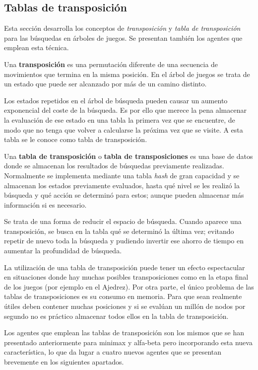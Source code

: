 \subsection{Tablas de transposición}
\label{ssec:tablas_transposicion}
Esta sección desarrolla los conceptos de \textit{transposición} y \textit{tabla de transposición} para las búsquedas en árboles de juegos.
Se presentan también los agentes que emplean esta técnica.

\bigskip
Una \textbf{transposición} es una permutación diferente de una secuencia de movimientos que termina en la misma posición.
En el árbol de juegos se trata de un estado que puede ser alcanzado por más de un camino distinto.

Los estados repetidos en el árbol de búsqueda pueden causar un aumento exponencial del coste de la búsqueda.
Es por ello que merece la pena almacenar la evaluación de ese estado en una tabla la primera vez que se encuentre, de modo que no tenga que volver a calcularse la próxima vez que se visite.
A esta tabla se le conoce como tabla de transposición.

Una \textbf{tabla de transposición} o \textbf{tabla de transposiciones} es una base de datos donde se almacenan los resultados de búsquedas previamente realizadas.
Normalmente se implementa mediante una tabla \textit{hash} de gran capacidad y se almacenan los estados previamente evaluados, hasta qué nivel se les realizó la búsqueda y qué acción se determinó para estos; aunque pueden almacenar más información si es necesario.

Se trata de una forma de reducir el espacio de búsqueda.
Cuando aparece una transposición, se busca en la tabla qué se determinó la última vez; evitando repetir de nuevo toda la búsqueda y pudiendo invertir ese ahorro de tiempo en aumentar la profundidad de búsqueda.

La utilización de una tabla de transposición puede tener un efecto espectacular en situaciones donde hay muchas posibles transposiciones como en la etapa final de los juegos (por ejemplo en el Ajedrez).
Por otra parte, el único problema de las tablas de transposiciones es su consumo en memoria.
Para que sean realmente útiles deben contener muchas posiciones y si se evalúan un millón de nodos por segundo no es práctico almacenar todos ellos en la tabla de transposición.

\bigskip
Los agentes que emplean las tablas de transposición son los mismos que se han presentado anteriormente para minimax y alfa-beta pero incorporando esta nueva característica, lo que da lugar a cuatro nuevos agentes que se presentan brevemente en los siguientes apartados.

